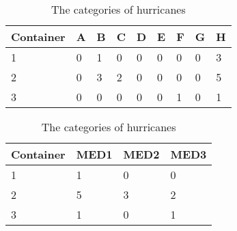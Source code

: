 \documentclass{mcmthesis}
\begin{document}
         \begin{table}[!ht]
            \caption{The categories of hurricanes}
             \renewcommand\arraystretch{1.5}
             \setlength{\abovecaptionskip}{0pt}%
            \setlength{\belowcaptionskip}{10pt}%
            \begin{center}
            \begin{tabular}{p{}p{}m{}}
            \toprule[1.5pt]
             Container & A & B & C & D & E & F & G & H\\
             \midrule
            
              1 & 0 & 1 & 0 & 0 & 0 & 0 & 0 & 3  \\
            
              2 & 0 & 3 & 2 & 0 & 0 & 0 & 0 & 5  \\
            
              3 & 0 & 0 & 0 & 0 & 0 & 1 & 0 & 1  \\
            
              \bottomrule[1.5pt]
             \end{tabular}
             \end{center} 
             \end{table}

             \begin{table}[!ht]
                \caption{The categories of hurricanes}
                 \renewcommand\arraystretch{1.5}
                 \setlength{\abovecaptionskip}{0pt}%
                \setlength{\belowcaptionskip}{10pt}%
                \begin{center}
                \begin{tabular}{p{}p{}m{}}
                \toprule[1.5pt]
                 Container & MED1 & MED2 & MED3\\
                 \midrule
                
                  1 & 1 & 0 & 0   \\
                
                  2 & 5 & 3 & 2   \\
                
                  3 & 1 & 0 & 1   \\
                
                  \bottomrule[1.5pt]
                 \end{tabular}
                 \end{center} 
                 \end{table}
\end{document}
